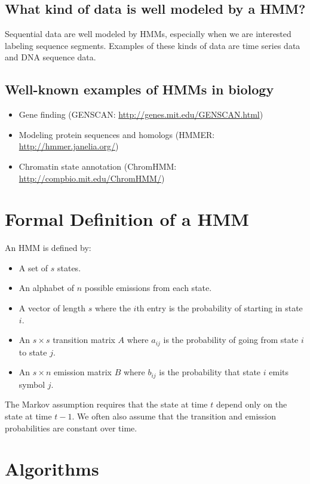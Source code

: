 \documentclass[11pt, oneside]{article}
\begin{document}
\subsection{What kind of data is well modeled by a HMM?}
Sequential data are well modeled by HMMs, especially when we are interested labeling sequence segments. Examples of these kinds of data are time series data and DNA sequence data. 

\subsection{Well-known examples of HMMs in biology}

\begin{itemize}
\item Gene finding (GENSCAN: \url{http://genes.mit.edu/GENSCAN.html})
\item Modeling protein sequences and homologs (HMMER: \url{http://hmmer.janelia.org/})
\item Chromatin state annotation (ChromHMM: \url{http://compbio.mit.edu/ChromHMM/})
\end{itemize}

\section{Formal Definition of a HMM}
An HMM is defined by:
\begin{itemize}
\item A set of $s$ states.
\item An alphabet of $n$ possible emissions from each state.
\item A vector of length $s$ where the $i$th entry is the probability of starting in state $i$.
\item An $s\times s$ transition matrix $A$ where $a_{ij}$ is the probability of going from state $i$ to state $j$.
\item An $s \times n$ emission matrix $B$ where $b_{ij}$ is the probability that state $i$ emits symbol $j$.
\end{itemize}

The Markov assumption requires that the state at time $t$ depend only on the state at time $t-1$. We often also assume that the transition and emission probabilities are constant over time.

\section{Algorithms}
\end{document}
